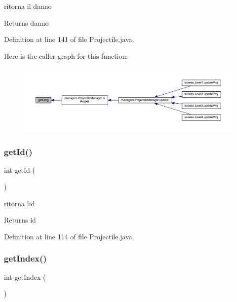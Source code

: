 ritorna il danno 

\begin{DoxyReturn}{Returns}
danno 
\end{DoxyReturn}


Definition at line 141 of file Projectile.\+java.

Here is the caller graph for this function\+:
\nopagebreak
\begin{figure}[H]
\begin{center}
\leavevmode
\includegraphics[width=350pt]{classobjects_1_1_projectile_a3eb7b7894f5f3b1409005aecd00a38ad_icgraph}
\end{center}
\end{figure}
\mbox{\label{classobjects_1_1_projectile_a67283be3f45257d1e0c474c563ebb6b6}} 
\subsubsection{\texorpdfstring{get\+Id()}{getId()}}
{\footnotesize\ttfamily int get\+Id (\begin{DoxyParamCaption}{ }\end{DoxyParamCaption})}



ritorna l\textquotesingle{}id 

\begin{DoxyReturn}{Returns}
id 
\end{DoxyReturn}


Definition at line 114 of file Projectile.\+java.

\mbox{\label{classobjects_1_1_projectile_a59d053c950ff1e9f8a004d493f34e754}} 
\subsubsection{\texorpdfstring{get\+Index()}{getIndex()}}
{\footnotesize\ttfamily int get\+Index (\begin{DoxyParamCaption}{ }\end{DoxyParamCaption})}




